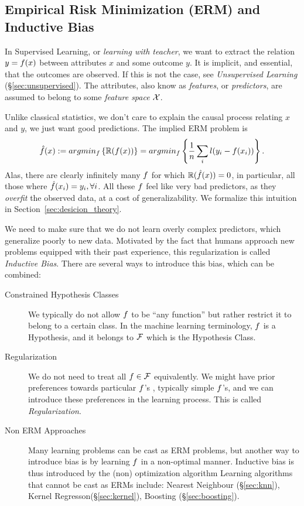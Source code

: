 \subsection{Empirical Risk Minimization (ERM) and Inductive Bias}
In Supervised Learning, or \emph{learning with teacher},  we want to extract the relation $y=f(x)$ between attributes $x$ and some outcome $y$.
It is implicit, and essential, that the outcomes are observed. If this is not the case, see \emph{Unsupervised Learning }(\S\ref{sec:unsupervised}).
The attributes, also know as \emph{features}, or \emph{predictors}, are assumed to belong to some \emph{feature space} $\mathcal{X}$. 

Unlike classical statistics, we don't care to explain the causal process relating $x$ and $y$, we just want good predictions.  The implied ERM problem is
\begin{align}
	\hat{f}(x) := argmin_{f}\left\{ \mathbb{R}(f(x)) \right\} = argmin_{f}\left\{ \frac{1}{n} \sum_i l(y_i - f(x_i)) \right\}.
\end{align}
Alas, there are clearly infinitely many $f$ for which $\mathbb{R}(\hat{f}(x))=0$, in particular, all those where $\hat{f}(x_i)=y_i, \forall i$.
All these $f$ feel like very bad predictors, as they \emph{overfit} the observed data, at a cost of generalizability.
We formalize this intuition in Section~\ref{sec:desicion_theory}. 

We need to make sure that we do not learn overly complex predictors, which generalize poorly to new data.
Motivated by the fact that humans approach new problems equipped with their past experience, this regularization is called \emph{Inductive Bias}. 
There are several ways to introduce this bias, which can be combined:
\begin{description}
\item[Constrained Hypothesis Classes]
We typically do not allow $f$ to be ``any function'' but rather restrict it to belong to a certain class. In the machine learning terminology, $f$ is a Hypothesis, and it belongs to $\mathcal{F}$ which is the Hypothesis Class.
\item[Regularization] We do not need to treat all $f \in \mathcal{F}$ equivalently. We might have prior preferences towards particular $f$'s , typically simple $f$'s, and we can introduce these preferences in the learning process. This is called \emph{Regularization}.
\item[Non ERM Approaches] Many learning problems can be cast as ERM problems, but another way to introduce bias is by learning $f$ in a non-optimal manner. Inductive bias is thus introduced by the (non) optimization algorithm 
Learning algorithms that cannot be cast as ERMs include: Nearest Neighbour (\S\ref{sec:knn}), Kernel Regresson(\S\ref{sec:kernel}), Boosting (\S\ref{sec:boosting}).
\end{description}

